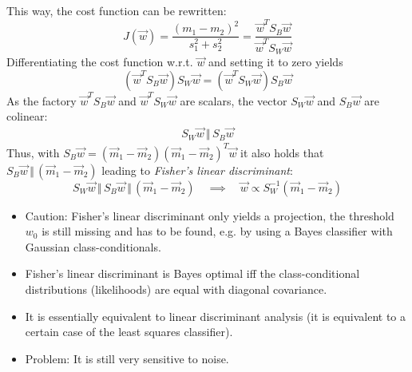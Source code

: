 			This way, the cost function can be rewritten:
			\begin{equation}
				J(\vec{w}) = \frac{(m_1 - m_2)^2}{s_1^2 + s_2^2} = \frac{\vec{w}^T S_B \vec{w}}{\vec{w}^T S_W \vec{w}}
			\end{equation}
			Differentiating the cost function w.r.t. \(\vec{w}\) and setting it to zero yields
			\begin{equation}
				(\vec{w}^T S_B \vec{w}) S_W \vec{w} = (\vec{w}^T S_W \vec{w}) S_B \vec{w}
			\end{equation}
			As the factory \( \vec{w}^T S_B \vec{w} \) and \( \vec{w}^T S_W \vec{w} \) are scalars, the vector \( S_W \vec{w} \) and \( S_B \vec{w} \) are colinear:
			\begin{eqnarray}
				S_W \vec{w} \,\Vert\, S_B \vec{w}
			\end{eqnarray}
			Thus, with \( S_B \vec{w} = (\vec{m}_1 - \vec{m}_2) (\vec{m}_1 - \vec{m}_2)^T \vec{w} \) it also holds that \( S_B \vec{w} \,\Vert\, (\vec{m}_1 - \vec{m}_2) \) leading to \emph{Fisher's linear discriminant}:
			\begin{equation}
				S_W \vec{w} \,\Vert\, S_B \vec{w} \,\Vert\, (\vec{m}_1 - \vec{m}_2) \quad\implies\quad \vec{w} \propto S_W^{-1} (\vec{m}_1 - \vec{m}_2)
			\end{equation}

			\begin{itemize}
				\item Caution: Fisher's linear discriminant only yields a projection, the threshold \(w_0\) is still missing and has to be found, e.g. by using a Bayes classifier with Gaussian class-conditionals.
				\item Fisher's linear discriminant is Bayes optimal iff the class-conditional distributions (likelihoods) are equal with diagonal covariance.
				\item It is essentially equivalent to linear discriminant analysis (it is equivalent to a certain case of the least squares classifier).
				\item Problem: It is still very sensitive to noise.
			\end{itemize}


